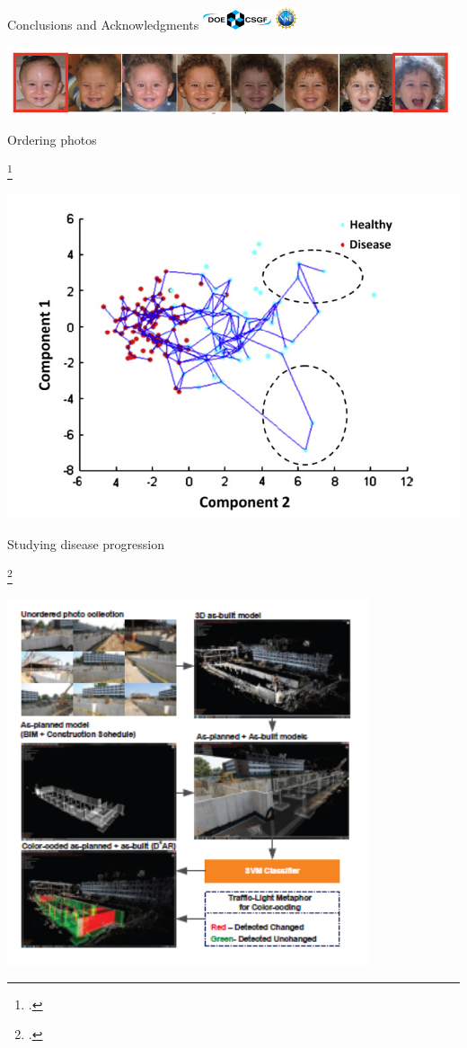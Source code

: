\documentclass[10pt]{beamer}
\begin{document}
\begin{frame}{Conclusions and Acknowledgments \hspace{0.5in} \includegraphics[width=0.15\textwidth]{CSGF_horiz_1200x360.png}
\hspace{0.1in} \includegraphics[width=0.05\textwidth]{nsf1.jpg}}
	\begin{minipage}{0.4\textwidth}
	\centering
	\includegraphics[width=\textwidth]{photobios2}
	\\ {\footnotesize Ordering photos \footnotemark \par}
	\end{minipage}
	\footcitetext{kemelmacher2011exploring}
	\hfill
	\begin{minipage}{0.2\textwidth}
	\centering
	\includegraphics[width=\textwidth]{disease_progression}	
	\\ {\footnotesize Studying disease progression \footnotemark \par}
	\end{minipage}
	\footcitetext{li2012modelling}
	\hfill
	\begin{minipage}{0.2\textwidth}
	\centering
	\includegraphics[width=0.8\textwidth]{buildings}

\end{minipage}
\end{frame}
\end{document}
